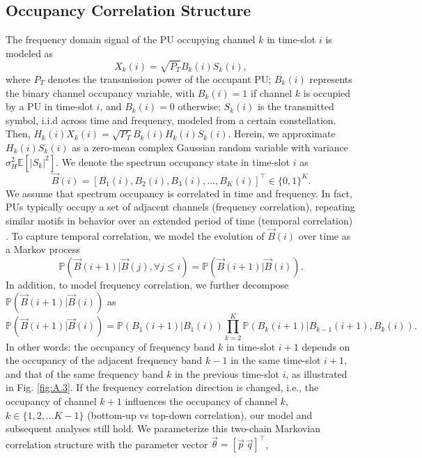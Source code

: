 \documentclass[12pt, draftcls, onecolumn]{IEEEtran}
\begin{document}
\subsection{Occupancy Correlation Structure}\label{I.II}
The frequency domain signal of the PU occupying channel $k$ in time-slot $i$ is modeled as
\begin{equation}\label{3}
    X_{k}(i)=\sqrt{P_{T}}B_{k}(i)S_{k}(i),
\end{equation}
where $P_{T}$ denotes the transmission power of the occupant PU; $B_{k}(i)$ represents the binary channel occupancy variable, with $B_{k}(i){=}1$ if channel $k$ is occupied by a PU in time-slot $i$, and $B_{k}(i){=}0$ otherwise; $S_{k}(i)$ is the transmitted symbol, i.i.d across time and frequency, modeled from a certain constellation. Then, $H_{k}(i)X_{k}(i){=}\sqrt{P_{T}}B_{k}(i)H_{k}(i)S_{k}(i)$. Herein, we approximate $H_{k}(i)S_{k}(i)$ as a zero-mean complex Gaussian random variable with variance $\sigma_{H}^{2}\mathbb{E}[|S_{k}|^{2}]$. We denote the spectrum occupancy state in time-slot $i$ as
\begin{equation}\label{4}
    \vec{B}(i)=[B_{1}(i),B_{2}(i),B_{3}(i),\dots,B_{K}(i)]^{\intercal}{\in}\{0,1\}^{K}.
\end{equation}
We assume that spectrum occupancy is correlated in time and frequency. In fact, PUs typically occupy a set of adjacent channels (frequency correlation), repeating similar motifs in behavior over an extended period of time (temporal correlation) \cite{WCL:12, 4213046,McHenry:2006:CSO:1234388.1234389}. To capture temporal correlation, we model the evolution of $\vec{B}(i)$ over time as a Markov process
\begin{equation}\label{5}
    \mathbb{P}(\vec{B}(i+1)|\vec{B}(j),\forall j \leq i)=\mathbb{P}(\vec{B}(i+1)|\vec{B}(i)).
\end{equation}
In addition, to model frequency correlation, we further decompose $\mathbb{P}(\vec{B}(i+1)|\vec{B}(i))$ as
\begin{equation}\label{6}
    \mathbb{P}(\vec{B}(i+1)|\vec{B}(i))=\mathbb{P}(B_{1}(i+1)|B_{1}(i))\prod_{k=2}^{K}\mathbb{P}(B_{k}(i+1)|B_{k-1}(i+1),B_{k}(i)).
\end{equation}
In other words: the occupancy of frequency band $k$ in time-slot $i+1$ depends on the occupancy of the adjacent frequency band $k-1$ in the same time-slot $i+1$, and that of the same frequency band $k$ in the previous time-slot $i$,
as illustrated in Fig. \ref{fig:A.3}. If the frequency correlation direction is changed, i.e., the occupancy of channel $k+1$ influences the occupancy of channel $k$, $k{\in}\{1,2,...K{-}1\}$ (bottom-up vs top-down correlation), our model and subsequent analyses still hold. We parameterize this two-chain Markovian correlation structure with the parameter vector $\vec{\theta}=[\vec{p}\ \vec{q}]^{\intercal}$, 
\end{document}
